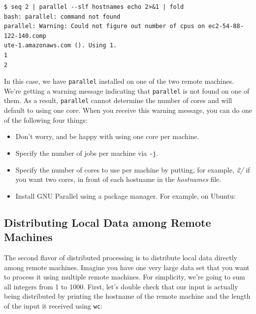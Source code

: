 \documentclass[
]{book}
\newenvironment{Shaded}{\begin{snugshade}}{\end{snugshade}}
\newcommand{\ExtensionTok}[1]{#1}
\newcommand{\NormalTok}[1]{#1}
\newcommand{\StringTok}[1]{\textcolor[rgb]{0.31,0.60,0.02}{#1}}
\providecommand{\tightlist}{%
  \setlength{\itemsep}{0pt}\setlength{\parskip}{0pt}}
\theoremstyle{definition}
\theoremstyle{definition}
\theoremstyle{definition}
\theoremstyle{remark}
\begin{document}
\begin{verbatim}
$ seq 2 | parallel --slf hostnames echo 2>&1 | fold
bash: parallel: command not found
parallel: Warning: Could not figure out number of cpus on ec2-54-88-122-140.comp
ute-1.amazonaws.com (). Using 1.
1
2
\end{verbatim}

In this case, we have \texttt{parallel} installed on one of the two remote machines. We're getting a warning message indicating that \texttt{parallel} is not found on one of them. As a result, \texttt{parallel} cannot determine the number of cores and will default to using one core. When you receive this warning message, you can do one of the following four things:

\begin{itemize}
\tightlist
\item
  Don't worry, and be happy with using one core per machine.
\item
  Specify the number of jobs per machine via \texttt{-j}.
\item
  Specify the number of cores to use per machine by putting, for example, \emph{2/} if you want two cores, in front of each hostname in the \emph{hostnames} file.
\item
  Install GNU Parallel using a package manager. For example, on Ubuntu:
\end{itemize}

\begin{Shaded}
\end{Shaded}

\hypertarget{distributing-local-data-among-remote-machines}{%
\subsection{Distributing Local Data among Remote Machines}\label{distributing-local-data-among-remote-machines}}

The second flavor of distributed processing is to distribute local data directly among remote machines. Imagine you have one very large data set that you want to process it using multiple remote machines. For simplicity, we're going to sum all integers from 1 to 1000. First, let's double check that our input is actually being distributed by printing the hostname of the remote machine and the length of the input it received using \texttt{wc}:
\end{document}
